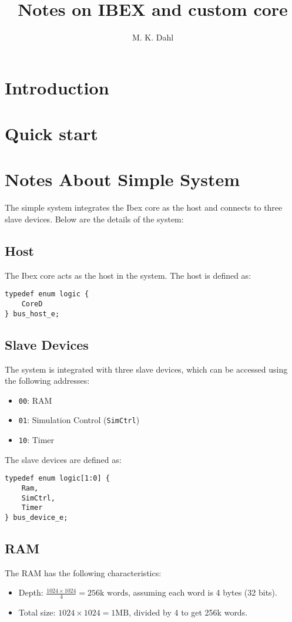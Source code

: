 \documentclass{article}
\title{Notes on IBEX and custom core}
\author{M. K. Dahl}
\begin{document}
\maketitle

\section{Introduction}

\section{Quick start}

\section{Notes About Simple System}

The simple system integrates the Ibex core as the host and connects to three slave devices. Below are the details of the system:

\subsection{Host}
The Ibex core acts as the host in the system. The host is defined as:
\begin{verbatim}
typedef enum logic {
    CoreD
} bus_host_e;
\end{verbatim}

\subsection{Slave Devices}
The system is integrated with three slave devices, which can be accessed using the following addresses:
\begin{itemize}
    \item \texttt{00}: RAM
    \item \texttt{01}: Simulation Control (\texttt{SimCtrl})
    \item \texttt{10}: Timer
\end{itemize}

The slave devices are defined as:
\begin{verbatim}
typedef enum logic[1:0] {
    Ram,
    SimCtrl,
    Timer
} bus_device_e;
\end{verbatim}

\subsection{RAM}
The RAM has the following characteristics:
\begin{itemize}
    \item Depth: \( \frac{1024 \times 1024}{4} = 256\text{k words} \), assuming each word is 4 bytes (32 bits).
    \item Total size: \( 1024 \times 1024 = 1\text{MB} \), divided by 4 to get 256k words.
\end{itemize}
\end{document}

